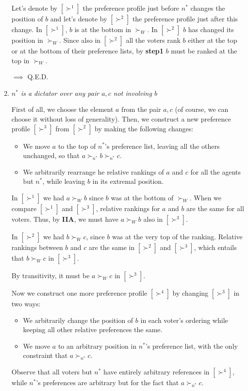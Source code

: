 \begin{enumerate}
	\noindent Let's denote by $[\succ^1]$ the preference profile just before 
	$n^*$ changes the position of $b$ and let's denote by $[\succ^2]$ the 
	preference profile just after this change. In $[\succ^1]$, $b$ is at the 
	bottom in $\succ_W$. In $[\succ^2]$ $b$ has changed its position in 
	$\succ_W$. Since also in $[\succ^2]$ all the voters rank $b$ either at the 
	top or at the bottom of their preference lists, by \textbf{step1} $b$ must 
	be ranked at the top in $\succ_W$.

	\noindent $\implies$ Q.E.D.

	\item \textit{$n^*$ is a dictator over any pair $a,c$ not involving $b$}

	\noindent First of all, we choose the element $a$ from the pair $a,c$ (of 
	course, we can choose it without loss of generality). Then, we construct a 
	new preference profile $[\succ^3]$ from $[\succ^2]$ by making the following 
	changes:
	\begin{itemize}
		\item We move $a$ to the top of $n^*$'s preference list, leaving all 
		the others unchanged, so that $a \succ_{n^*} b \succ_{n^*} c$.
		\item We arbitrarily rearrange he relative rankings of $a$ and $c$ for 
		all the agents but $n^*$, while leaving $b$ in its extremal position.
	\end{itemize}
	In $[\succ^1]$ we had $a \succ_W b$ since $b$ was at the bottom of 
	$\succ_W$. When we compare $[\succ^1]$ and $[\succ^3]$, relative rankings 
	for $a$ and $b$ are the same for all voters. Thus, by \textbf{IIA}, we must 
	have $a \succ_W b$ also in $[\succ^3]$.

	\noindent In $[\succ^2]$ we had $b \succ_W c$, since $b$ was at the very top 
	of the ranking. Relative rankings between $b$ and $c$ are the same in 
	$[\succ^2]$ and $[\succ^3]$, which entails that $b \succ_W c$ in $[\succ^3]$.

	\noindent By transitivity, it must be $a \succ_W c$ in $[\succ^3]$.

	\noindent Now we construct one more preference profile $[\succ^4]$ by 
	changing $[\succ^3]$ in two ways:
	\begin{itemize}
		\item We arbitrarily change the position of $b$ in each voter's ordering 
		while keeping all other relative preferences the same.
		\item We move $a$ to an arbitrary position in $n^*$'s preference list, 
		with the only constraint that $a \succ_{n^*} c$.
	\end{itemize}
	Observe that all voters but $n^*$ have entirely arbitrary references in 
	$[\succ^4]$, while $n^*$'s preferences are arbitrary but for the fact that 
	$a \succ_{n^*} c$.


\end{enumerate}
